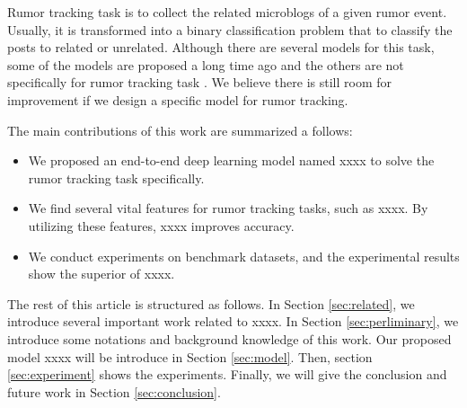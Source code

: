Rumor tracking task is to collect the related microblogs of a given rumor event. Usually, it is transformed into a binary classification problem that to classify the posts to related or unrelated. Although there are several models for this task, some of the models are proposed a long time ago \cite{DBLP:conf/emnlp/QazvinianRRM11} and the others are not specifically for rumor tracking task \cite{DBLP:conf/www/ChengNB20}.
We believe there is still room for improvement if we design a specific model for rumor tracking. 

The main contributions of this work are summarized a follows:
\begin{itemize}
	\item We proposed an end-to-end deep learning model named xxxx to solve the rumor tracking task specifically.
	\item We find several vital features for rumor tracking tasks, such as xxxx. By utilizing these features, xxxx improves accuracy.
	\item We conduct experiments on benchmark datasets, and the experimental results show the superior of xxxx.
\end{itemize}

The rest of this article is structured as follows. In Section \ref{sec:related}, we introduce several important work related to xxxx. In Section \ref{sec:perliminary}, we introduce some notations and background knowledge of this work. Our proposed model xxxx will be introduce in Section \ref{sec:model}. Then, section \ref{sec:experiment} shows the experiments. Finally, we will give the conclusion and future work in Section \ref{sec:conclusion}.